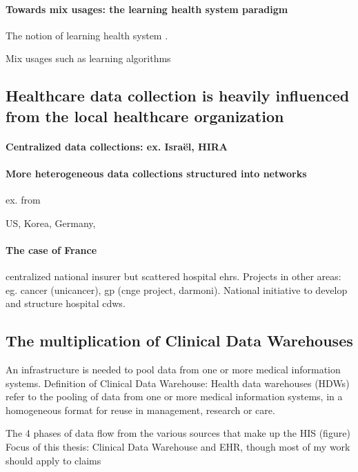 \documentclass{report}
\begin{document}
\paragraph{Towards mix usages: the learning health system paradigm}

The notion of learning health system \citep{mcginnis2013best}.

Mix usages such as learning algorithms

\subsection{Healthcare data collection is heavily influenced from the local healthcare organization}

\paragraph{Centralized data collections: ex. Israël, HIRA}

\paragraph{More heterogeneous data collections structured into networks} ex. from

US, Korea, Germany,

\paragraph{The case of France}

centralized national insurer but scattered hospital ehrs. Projects in other areas: eg. cancer (unicancer), gp (cnge project, darmoni). National initiative to develop and structure hospital cdws.

\subsection{The multiplication of Clinical Data Warehouses}\label{subsec:cdw:cdw_definition}

An infrastructure is needed to pool data from one or more medical information
systems. Definition of Clinical Data Warehouse: Health data warehouses (HDWs)
refer to the pooling of data from one or more medical information systems, in a
homogeneous format for reuse in management, research or care.


The 4 phases of data flow from the various sources that make up the HIS (figure)
Focus of this thesis: Clinical Data Warehouse and EHR, though most of my work should apply to claims
\end{document}
